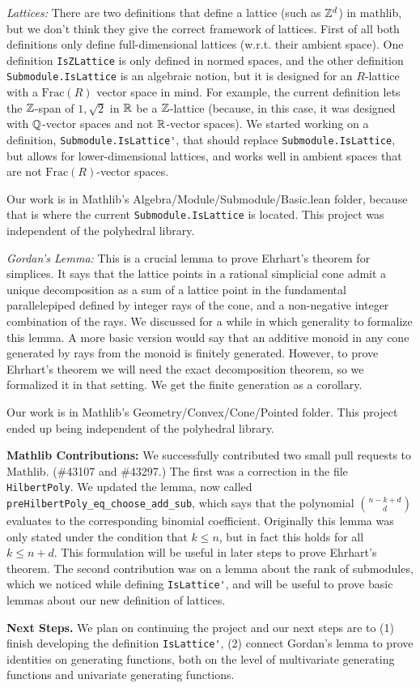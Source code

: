 \textit{Lattices:} There are two definitions that define a lattice (such as $\mathbb{Z}^d$) in mathlib, but we don't think they give the correct framework of lattices. First of all both definitions only define full-dimensional lattices (w.r.t. their ambient space). One definition \lstinline|IsZLattice| is only defined in normed spaces, and the other definition \lstinline|Submodule.IsLattice| is an algebraic notion, but it is designed for an $R$-lattice with a $\text{Frac}(R)$ vector space in mind. 
For example, the current definition lets the $\mathbb{Z}$-span of $1,\sqrt{2}$ in $\mathbb{R}$ be a $\mathbb{Z}$-lattice (because, in this case, it was designed with $\mathbb{Q}$-vector spaces and not $\mathbb{R}$-vector spaces). We started working on a definition, \lstinline|Submodule.IsLattice'|, that should replace \lstinline|Submodule.IsLattice|, but allows for lower-dimensional lattices, and works well in ambient spaces that are not $\text{Frac}(R)$-vector spaces. 

\medskip
Our work is in Mathlib's Algebra/Module/Submodule/Basic.lean folder, because that is where the current \lstinline|Submodule.IsLattice| is located. This project was independent of the polyhedral library.
\medskip 

\textit{Gordan's Lemma:} This is a crucial lemma to prove Ehrhart's theorem for simplices. It says that the lattice points in a rational simplicial cone admit a unique decomposition as a sum of a lattice point in the fundamental parallelepiped defined by integer rays of the cone, and a non-negative integer combination of the rays. We discussed for a while in which generality to formalize this lemma. A more basic version would say that an additive monoid in any cone generated by rays from the monoid is finitely generated. However, to prove Ehrhart's theorem we will need the exact decomposition theorem, so we formalized it in that setting. We get the finite generation as a corollary.
\medskip

Our work is in Mathlib's Geometry/Convex/Cone/Pointed folder. This project ended up being independent of the polyhedral library.
\medskip 

\textbf{Mathlib Contributions:} We successfully contributed two small pull requests to Mathlib. (\#43107 and \#43297.)
The first was a correction in the file \lstinline|HilbertPoly|. We updated the lemma, now called \lstinline|preHilbertPoly_eq_choose_add_sub|, which says that the polynomial $\binom{n-k+d}{d}$ evaluates to the corresponding binomial coefficient. Originally this lemma was only stated under the condition that $k \leq n$, but in fact this holds for all $k \leq n+d$. This formulation will be useful in later steps to prove Ehrhart's theorem. The second contribution was on a lemma about the rank of submodules, which we noticed while defining \lstinline|IsLattice'|, and will be useful to prove basic lemmas about our new definition of lattices.
\medskip 

\textbf{Next Steps.} We plan on continuing the project and our next steps are to (1) finish developing the definition \lstinline|IsLattice'|, (2) connect Gordan's lemma to prove identities on generating functions, both on the level of multivariate generating functions and univariate generating functions. 
